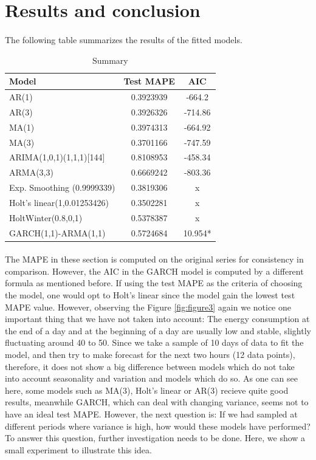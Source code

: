 \documentclass[12pt]{article}
\begin{document}
\section{Results and conclusion}
\paragraph{}
The following table summarizes the results of the fitted models.
\begin{table}[H]
  \begin{center}
    \caption{Summary}
    \label{tab:table5}
    \begin{tabular}{l|S|S} %
      \textbf{Model} & \textbf{Test MAPE} &  \textbf{AIC}\\
      \hline
  AR(1) &0.3923939  &-664.2\\
  AR(3) &0.3926326  &-714.86\\
  MA(1) &0.3974313  &-664.92\\
  MA(3) &0.3701166  &-747.59\\
  ARIMA(1,0,1)(1,1,1)[144]  &0.8108953  &-458.34\\
  ARMA(3,3) &0.6669242  &-803.36\\
  Exp. Smoothing (0.9999339)  &0.3819306  &x\\
  Holt's linear(1,0.01253426) &0.3502281  &x\\
  HoltWinter(0.8,0,1)  &0.5378387 &x\\
  GARCH(1,1)-ARMA(1,1)  &0.5724684  &10.954*\\
    \end{tabular}
  \end{center}
\end{table}

\paragraph{}
The MAPE in these section is computed on the original series for consistency in comparison. However, the AIC in the GARCH model is computed by a different formula as mentioned before. If using the test MAPE as the criteria of choosing the model, one would opt to Holt's linear since the model gain the lowest test MAPE value. However, observing the Figure \ref{fig:figure3} again we notice one important thing that we have not taken into account: The energy consumption at the end of a day and at the beginning of a day are usually low and stable, slightly fluctuating around 40 to 50. Since we take a sample of 10 days of data to fit the model, and then try to make forecast for the next two hours (12 data points), therefore, it does not show a big difference between models which do not take into account seasonality and variation and models which do so. As one can see here, some models such as MA(3), Holt's linear or AR(3) recieve quite good results, meanwhile GARCH, which can deal with changing variance, seems not to have an ideal test MAPE. However, the next question is: If we had sampled at different periods where variance is high, how would these models have performed? To answer this question, further investigation needs to be done. Here, we show a small experiment to illustrate this idea.
\end{document}

